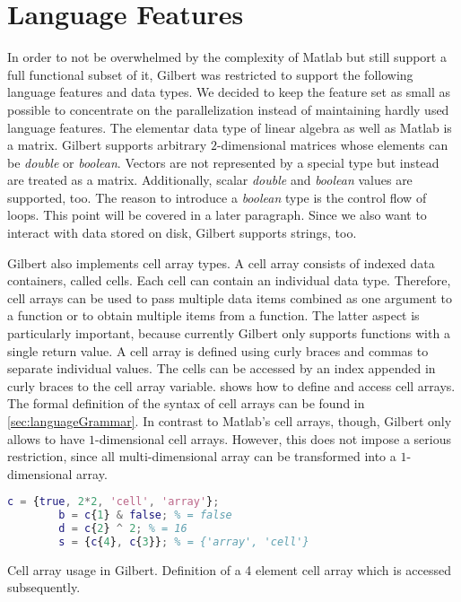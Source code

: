 \section{Language Features}
\label{sec:languageFeatures}

In order to not be overwhelmed by the complexity of Matlab but still support a full functional subset of it, Gilbert was restricted to support the following language features and data types.
We decided to keep the feature set as small as possible to concentrate on the parallelization instead of maintaining hardly used language features.
The elementar data type of linear algebra as well as Matlab is a matrix.
Gilbert supports arbitrary $2$-dimensional matrices whose elements can be \emph{double} or \emph{boolean}.
Vectors are not represented by a special type but instead are treated as a matrix.
Additionally, scalar \emph{double} and \emph{boolean} values are supported, too.
The reason to introduce a \emph{boolean} type is the control flow of loops.
This point will be covered in a later paragraph.
Since we also want to interact with data stored on disk, Gilbert supports strings, too.

Gilbert also implements cell array types.
A cell array consists of indexed data containers, called cells.
Each cell can contain an individual data type.
Therefore, cell arrays can be used to pass multiple data items combined as one argument to a function or to obtain multiple items from a function.
The latter aspect is particularly important, because currently Gilbert only supports functions with a single return value.
A cell array is defined using curly braces and commas to separate individual values.
The cells can be accessed by an index appended in curly braces to the cell array variable.
 shows how to define and access cell arrays.
The formal definition of the syntax of cell arrays can be found in \cref{sec:languageGrammar}.
In contrast to Matlab's cell arrays, though, Gilbert only allows to have $1$-dimensional cell arrays.
However, this does not impose a serious restriction, since all multi-dimensional array can be transformed into a $1$-dimensional array. 

\begin{listing}[!h]
	\begin{CenteredBox}
		\begin{lstlisting}[language=Matlab]
		c = {true, 2*2, 'cell', 'array'};
		b = c{1} & false; % = false
		d = c{2} ^ 2; % = 16
		s = {c{4}, c{3}}; % = {'array', 'cell'} 
		\end{lstlisting}
	\end{CenteredBox}
	\caption{Cell array usage in Gilbert. Definition of a 4 element cell array which is accessed subsequently.}
	\label{lst:cellArray}
\end{listing}

